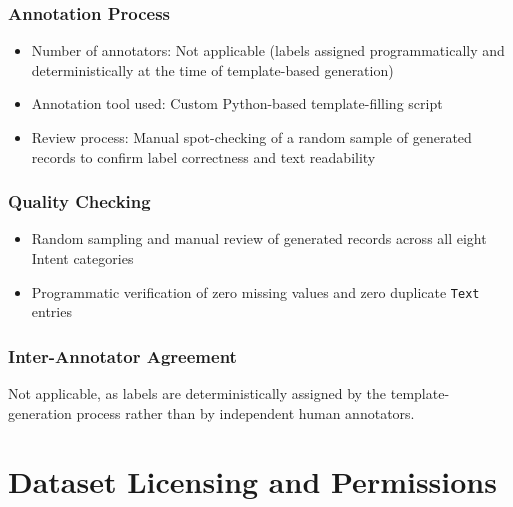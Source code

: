 \subsubsection*{Annotation Process}

\begin{itemize}
    \item Number of annotators: Not applicable (labels assigned programmatically and deterministically at the time of template-based generation)
    \item Annotation tool used: Custom Python-based template-filling script
    \item Review process: Manual spot-checking of a random sample of generated records to confirm label correctness and text readability
\end{itemize}

\subsubsection*{Quality Checking}

\begin{itemize}
    \item Random sampling and manual review of generated records across all eight Intent categories
    \item Programmatic verification of zero missing values and zero duplicate \texttt{Text} entries
\end{itemize}

\subsubsection*{Inter-Annotator Agreement}

Not applicable, as labels are deterministically assigned by the template-generation process rather than by independent human annotators.


\section{Dataset Licensing and Permissions}
\label{sec:datasetlicensing}

